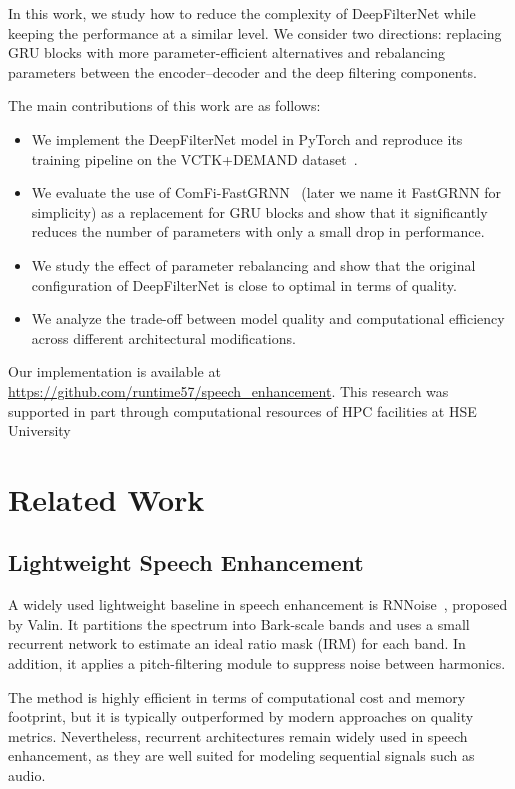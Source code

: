 \documentclass[a4paper,12pt]{extarticle}
\begin{document}
In this work, we study how to reduce the complexity of DeepFilterNet while keeping the performance at a similar level.
We consider two directions: replacing GRU blocks with more parameter-efficient alternatives and rebalancing parameters
between the encoder--decoder and the deep filtering components.

The main contributions of this work are as follows:
\begin{itemize}
    \item We implement the DeepFilterNet model in PyTorch and reproduce its training pipeline on the VCTK+DEMAND dataset~\cite{vctk}.
    \item We evaluate the use of ComFi-FastGRNN~\cite{fastulcnet} (later we name it FastGRNN for simplicity) as a replacement for GRU blocks and show that it significantly reduces
	the number of parameters with only a small drop in performance.
    \item We study the effect of parameter rebalancing and show that the original configuration of DeepFilterNet is
	close to optimal in terms of quality.
    \item We analyze the trade-off between model quality and computational efficiency across different architectural
	modifications.
\end{itemize}

Our implementation is available at \url{https://github.com/runtime57/speech_enhancement}. This research was supported in
part through computational resources of HPC facilities at HSE University


\section{Related Work}

\subsection{Lightweight Speech Enhancement}

A widely used lightweight baseline in speech enhancement is RNNoise~\cite{rnnoise}, proposed by Valin. It partitions the
spectrum into Bark-scale bands and uses a small recurrent network to estimate an ideal ratio mask (IRM) for each band.
In addition, it applies a pitch-filtering module to suppress noise between harmonics. 

The method is highly efficient in terms of computational cost and memory footprint, but it is typically outperformed
by modern approaches on quality metrics. Nevertheless, recurrent architectures remain widely used in speech enhancement,
as they are well suited for modeling sequential signals such as audio.
\end{document}
